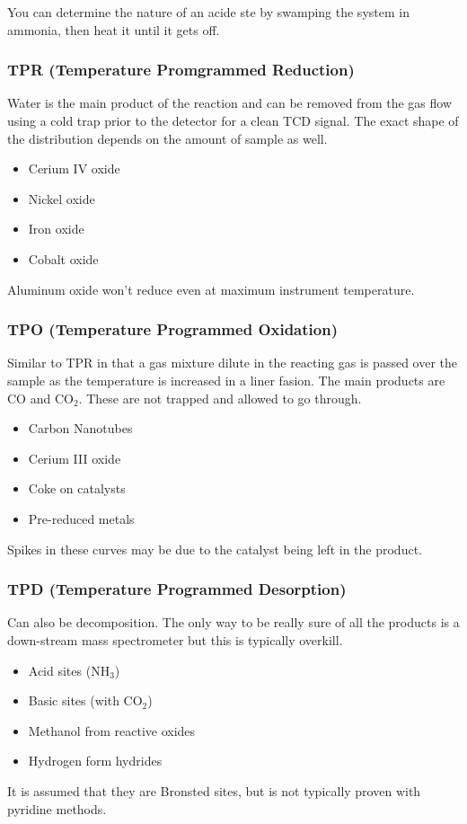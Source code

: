 \documentclass[12pt,a4paper,oneside,headinclude]{scrartcl}
\numberwithin{figure}{section}
\numberwithin{equation}{section}
\numberwithin{table}{section}
\begin{document}
You can determine the nature of an acide ste by swamping the system in ammonia,
then heat it until it gets off.

\subsubsection{TPR (Temperature Promgrammed Reduction)}
\label{sec:org65d1b58}
Water is the main product of the reaction and can be removed from the gas flow
using a cold trap prior to the detector for a clean TCD signal. The exact shape
of the distribution depends on the amount of sample as well.
\begin{itemize}
\item Cerium IV oxide
\item Nickel oxide
\item Iron oxide
\item Cobalt oxide
\end{itemize}
Aluminum oxide won't reduce even at maximum instrument temperature.
\subsubsection{TPO (Temperature Programmed Oxidation)}
\label{sec:org16e0880}
Similar to TPR in that a gas mixture dilute in the reacting gas is passed over
the sample as the temperature is increased in a liner fasion. The main products
are CO and CO\(_{\text{2}}\). These are not trapped and allowed to go through.
\begin{itemize}
\item Carbon Nanotubes
\item Cerium III oxide
\item Coke on catalysts
\item Pre-reduced metals
\end{itemize}
Spikes in these curves may be due to the catalyst being left in the product.
\subsubsection{TPD (Temperature Programmed Desorption)}
\label{sec:org712d81d}
Can also be decomposition. The only way to be really sure of all the products is
a down-stream mass spectrometer but this is typically overkill.
\begin{itemize}
\item Acid sites (NH\(_{\text{3}}\))
\item Basic sites (with CO\(_{\text{2}}\))
\item Methanol from reactive oxides
\item Hydrogen form hydrides
\end{itemize}
It is assumed that they are Bronsted sites, but is not typically proven with
pyridine methods.
\end{document}
